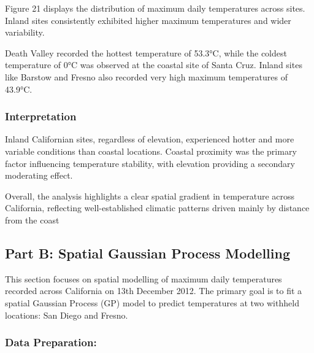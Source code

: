 \documentclass[
  11pt,
]{article}
\begin{document}
Figure 21 displays the distribution of maximum daily temperatures across
sites. Inland sites consistently exhibited higher maximum temperatures
and wider variability.

Death Valley recorded the hottest temperature of 53.3°C, while the
coldest temperature of 0°C was observed at the coastal site of Santa
Cruz. Inland sites like Barstow and Fresno also recorded very high
maximum temperatures of 43.9°C.

\subsubsection{Interpretation}\label{interpretation-1}

Inland Californian sites, regardless of elevation, experienced hotter
and more variable conditions than coastal locations. Coastal proximity
was the primary factor influencing temperature stability, with elevation
providing a secondary moderating effect.

Overall, the analysis highlights a clear spatial gradient in temperature
across California, reflecting well-established climatic patterns driven
mainly by distance from the coast

\subsection{Part B: Spatial Gaussian Process
Modelling}\label{part-b-spatial-gaussian-process-modelling}

This section focuses on spatial modelling of maximum daily temperatures
recorded across California on 13th December 2012. The primary goal is to
fit a spatial Gaussian Process (GP) model to predict temperatures at two
withheld locations: San Diego and Fresno.

\subsubsection{Data Preparation:}\label{data-preparation}
\end{document}
